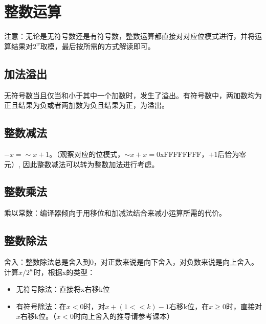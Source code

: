 \documentclass[twoside]{ctexart}
\begin{document}
	\section{整数运算}
	注意：无论是无符号数还是有符号数，整数运算都直接对对应位模式进行，并将运算结果对$2^w$取模，最后按所需的方式解读即可。
	\subsection{加法溢出}
	无符号数当且仅当和小于其中一个加数时，发生了溢出。有符号数中，两加数均为正且结果为负或者两加数为负且结果为正，为溢出。
	
	\subsection{整数减法}
	$-x = \sim x + 1$。（观察对应的位模式，$\sim x + x=$0xFFFFFFFF，$+1$后恰为零元）,	因此整数减法可以转为整数加法进行考虑。
	\subsection{整数乘法}
	乘以常数：编译器倾向于用移位和加减法结合来减小运算所需的代价。
	
	\subsection{整数除法}
	舍入：整数除法总是舍入到0，对正数来说是向下舍入，对负数来说是向上舍入。
	计算$x/2^{w}$时，根据x的类型：
	\begin{itemize}
	    \item 无符号除法：直接将x右移k位
	    \item 有符号除法：在$x<0$时，对$x + (1 << k) - 1$右移k位，在$x\ge 0$时，直接对$x$右移k位。（$x<0$时向上舍入的推导请参考课本）
	\end{itemize}
\end{document}
